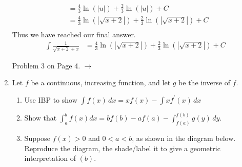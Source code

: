 \documentclass{article}
\begin{document}
\begin{enumerate}[label=\textbf{(4.\arabic*)}]
\begin{align*}
    &=\frac{4}{3}\ln(|u|)+\frac{2}{3}\ln(|u|)+C \\
    &=\frac{4}{3}\ln(|\sqrt{x+2}|)+\frac{2}{3}\ln(|\sqrt{x+2}|)+C \\
\end{align*}
Thus we have reached our final answer.
\begin{align*}
\int\!\frac{1}{\sqrt{x+2}+x}&=\frac{4}{3}\ln(|\sqrt{x+2}|)+\frac{2}{3}\ln(|\sqrt{x+2}|)+C
\end{align*}
\begin{center}
Problem 3 on Page 4. $\rightarrow$
\end{center}

\newpage


\item Let $f$ be a continuous, increasing function, and let $g$ be the inverse of $f$.
\begin{enumerate}[label=(\alph*)]
    \item Use IBP to show $\displaystyle{\int\!f(x)\,dx=xf(x)-\int\!xf^\prime(x)\,dx}$
    \item Show that $\displaystyle{\int_a^b\!f(x)dx=bf(b)-af(a)-\int_{f(a)}^{f(b)}\!g(y)\,dy}.$
    \item Suppose $f(x)>0$ and $0<a<b$, as shown in the diagram below. Reproduce the diagram, the shade/label it to give a geometric interpretation of $(b)$.
\end{enumerate}


\end{enumerate}
\end{document}
